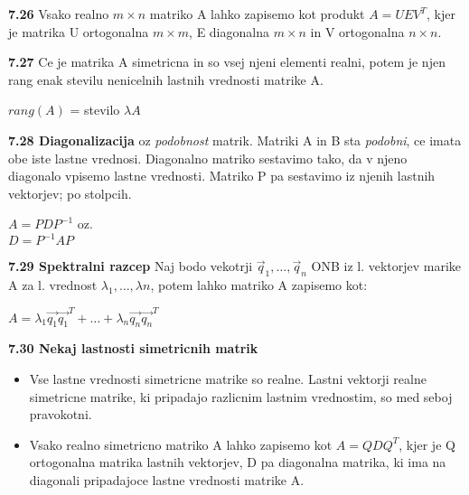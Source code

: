 \documentclass{article}
\begin{document}
\begin{multicols}{2}
\textbf{7.26} Vsako realno $m \times n$ matriko A lahko zapisemo kot produkt
$A = UEV^{T}$, kjer je matrika U ortogonalna $m \times m$, E diagonalna $m \times n$ in
V ortogonalna $n \times n$.

\textbf{7.27} Ce je  matrika A simetricna in so vsej njeni elementi realni, potem je njen rang enak stevilu nenicelnih lastnih
vrednosti matrike A.
\begin{center}
    $rang(A)$ = stevilo $\lambda A$
\end{center}

\textbf{7.28 Diagonalizacija} oz \textit{podobnost} matrik. Matriki A in B sta \textit{podobni}, ce imata
obe iste lastne vrednosi. Diagonalno matriko sestavimo tako, da v njeno diagonalo vpisemo lastne vrednosti. Matriko 
P pa sestavimo iz njenih lastnih vektorjev; po stolpcih.
\begin{center}
    \begin{math}
        A = PDP^{-1}
    \end{math} oz.\\
    \begin{math}
        D = P^{-1}AP
    \end{math}
\end{center}

\textbf{7.29 Spektralni razcep}
Naj bodo vekotrji $\vec{q}_{1}, \dots, \vec{q}_{n}$ ONB iz l. vektorjev marike A za l. vrednost $\lambda_{1}, \dots, \lambda{n}$,
potem lahko matriko A zapisemo kot:
\begin{center}
    \begin{math}
        A = \lambda_{1} \vec{q_{1}} \vec{q_{1}}^{T} + \dots + \lambda_{n} \vec{q_{n}} \vec{q_{n}}^{T}
    \end{math}
\end{center}

\textbf{7.30 Nekaj lastnosti simetricnih matrik}
\begin{itemize}
    \item Vse lastne vrednosti simetricne matrike so realne. Lastni vektorji realne simetricne matrike, ki 
    pripadajo razlicnim lastnim vrednostim, so med seboj pravokotni.
    \item Vsako realno simetricno matriko A lahko zapisemo kot $A = QDQ^{T}$, kjer je Q ortogonalna matrika lastnih vektorjev, D pa diagonalna matrika,
    ki ima na diagonali pripadajoce lastne vrednosti matrike A.
\end{itemize}

\end{multicols}
\end{document}
